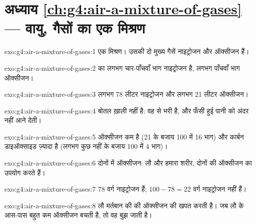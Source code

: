 \section*{अध्याय \ref{ch:g4:air-a-mixture-of-gases} --- वायु, गैसों का एक मिश्रण}

\begin{solution}{exo:g4:air-a-mixture-of-gases:1}
एक मिश्रण। उसकी दो मुख्य गैसें नाइट्रोजन और ऑक्सीजन हैं।
\end{solution}

\begin{solution}{exo:g4:air-a-mixture-of-gases:2}
 का लगभग चार-पाँचवाँ भाग नाइट्रोजन है, लगभग पाँचवाँ भाग ऑक्सीजन।
\end{solution}

\begin{solution}{exo:g4:air-a-mixture-of-gases:3}
लगभग 78 लीटर नाइट्रोजन और लगभग 21 लीटर ऑक्सीजन।
\end{solution}

\begin{solution}{exo:g4:air-a-mixture-of-gases:4}
बोतल ख़ाली नहीं है: वह  से भरी है, और फँसी हुई  पानी को अंदर
नहीं आने देती।
\end{solution}

\begin{solution}{exo:g4:air-a-mixture-of-gases:5}
ऑक्सीजन कम है (21 के बजाय 100 में 16 भाग) और कार्बन डाइऑक्साइड ज़्यादा
है (लगभग कुछ नहीं के बजाय 100 में 4 भाग)।
\end{solution}

\begin{solution}{exo:g4:air-a-mixture-of-gases:6}
दोनों में ऑक्सीजन: लौ और हमारा शरीर, दोनों  की ऑक्सीजन का
उपयोग करते हैं।
\end{solution}

\begin{solution}{exo:g4:air-a-mixture-of-gases:7}
78 वर्ग नाइट्रोजन हैं; $100 - 78 = 22$ वर्ग नाइट्रोजन नहीं हैं।
\end{solution}

\begin{solution}{exo:g4:air-a-mixture-of-gases:8}
लौ मर्तबान की  की ऑक्सीजन की खपत करती है। जब लौ के आस-पास बहुत कम
ऑक्सीजन बचती है, तो वह बुझ जाती है।
\end{solution}

